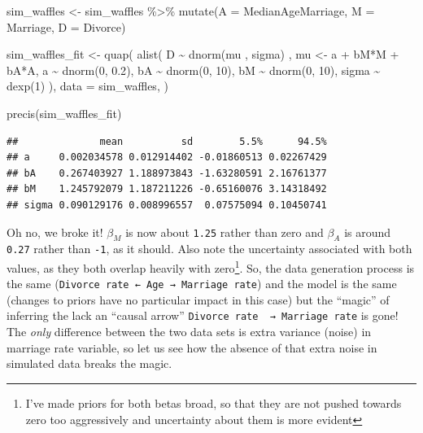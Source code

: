 \documentclass[
]{book}
\newenvironment{Shaded}{\begin{snugshade}}{\end{snugshade}}
\newcommand{\AttributeTok}[1]{\textcolor[rgb]{0.77,0.63,0.00}{#1}}
\newcommand{\DecValTok}[1]{\textcolor[rgb]{0.00,0.00,0.81}{#1}}
\newcommand{\FloatTok}[1]{\textcolor[rgb]{0.00,0.00,0.81}{#1}}
\newcommand{\FunctionTok}[1]{\textcolor[rgb]{0.00,0.00,0.00}{#1}}
\newcommand{\NormalTok}[1]{#1}
\newcommand{\OtherTok}[1]{\textcolor[rgb]{0.56,0.35,0.01}{#1}}
\newcommand{\SpecialCharTok}[1]{\textcolor[rgb]{0.00,0.00,0.00}{#1}}
\begin{document}
\begin{Shaded}
\begin{Highlighting}[]
\NormalTok{sim\_waffles }\OtherTok{\textless{}{-}}
\NormalTok{  sim\_waffles }\SpecialCharTok{\%\textgreater{}\%}
  \FunctionTok{mutate}\NormalTok{(}\AttributeTok{A =}\NormalTok{ MedianAgeMarriage,}
         \AttributeTok{M =}\NormalTok{ Marriage,}
         \AttributeTok{D =}\NormalTok{ Divorce)}

\NormalTok{sim\_waffles\_fit }\OtherTok{\textless{}{-}} \FunctionTok{quap}\NormalTok{(}
  \FunctionTok{alist}\NormalTok{(}
\NormalTok{    D }\SpecialCharTok{\textasciitilde{}} \FunctionTok{dnorm}\NormalTok{(mu , sigma) ,}
\NormalTok{    mu }\OtherTok{\textless{}{-}}\NormalTok{ a }\SpecialCharTok{+}\NormalTok{ bM}\SpecialCharTok{*}\NormalTok{M }\SpecialCharTok{+}\NormalTok{ bA}\SpecialCharTok{*}\NormalTok{A,}
\NormalTok{    a }\SpecialCharTok{\textasciitilde{}} \FunctionTok{dnorm}\NormalTok{(}\DecValTok{0}\NormalTok{, }\FloatTok{0.2}\NormalTok{),}
\NormalTok{    bA }\SpecialCharTok{\textasciitilde{}} \FunctionTok{dnorm}\NormalTok{(}\DecValTok{0}\NormalTok{, }\DecValTok{10}\NormalTok{),}
\NormalTok{    bM }\SpecialCharTok{\textasciitilde{}} \FunctionTok{dnorm}\NormalTok{(}\DecValTok{0}\NormalTok{, }\DecValTok{10}\NormalTok{),}
\NormalTok{    sigma }\SpecialCharTok{\textasciitilde{}} \FunctionTok{dexp}\NormalTok{(}\DecValTok{1}\NormalTok{)}
\NormalTok{  ), }
  \AttributeTok{data =}\NormalTok{ sim\_waffles,}
\NormalTok{)}

\FunctionTok{precis}\NormalTok{(sim\_waffles\_fit)}
\end{Highlighting}
\end{Shaded}

\begin{verbatim}
##              mean          sd        5.5%      94.5%
## a     0.002034578 0.012914402 -0.01860513 0.02267429
## bA    0.267403927 1.188973843 -1.63280591 2.16761377
## bM    1.245792079 1.187211226 -0.65160076 3.14318492
## sigma 0.090129176 0.008996557  0.07575094 0.10450741
\end{verbatim}

Oh no, we broke it! \(\beta_M\) is now about \texttt{1.25} rather than zero and \(\beta_A\) is around \texttt{0.27} rather than \texttt{-1}, as it should. Also note the uncertainty associated with both values, as they both overlap heavily with zero\footnote{I've made priors for both betas broad, so that they are not pushed towards zero too aggressively and uncertainty about them is more evident}. So, the data generation process is the same (\texttt{Divorce\ rate\ ←\ Age\ →\ Marriage\ rate}) and the model is the same (changes to priors have no particular impact in this case) but the ``magic'' of inferring the lack an ``causal arrow'' \texttt{Divorce\ rate\ \ →\ Marriage\ rate} is gone! The \emph{only} difference between the two data sets is extra variance (noise) in marriage rate variable, so let us see how the absence of that extra noise in simulated data breaks the magic.
\end{document}
